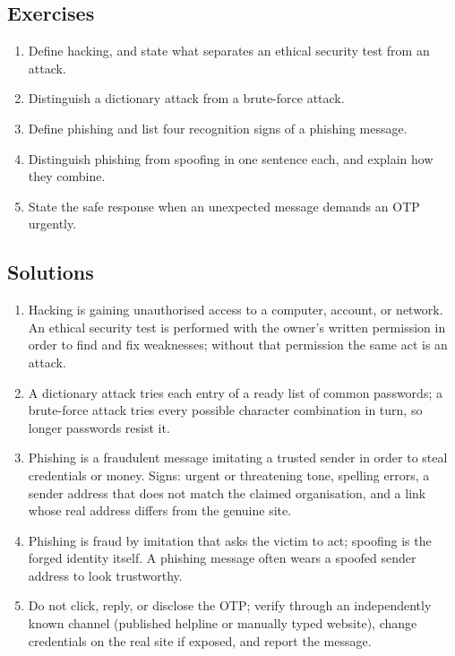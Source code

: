 \subsection*{Exercises}
\begin{enumerate}[label=\arabic*.]
  \item Define hacking, and state what separates an ethical security
    test from an attack.
  \item Distinguish a dictionary attack from a brute-force attack.
  \item Define phishing and list four recognition signs of a phishing
    message.
  \item Distinguish phishing from spoofing in one sentence each, and
    explain how they combine.
  \item State the safe response when an unexpected message demands an
    OTP urgently.
\end{enumerate}

\subsection*{Solutions}
\begingroup\small
\begin{enumerate}[label=\arabic*.]
  \item Hacking is gaining unauthorised access to a computer, account,
    or network. An ethical security test is performed with the owner's
    written permission in order to find and fix weaknesses; without
    that permission the same act is an attack.
  \item A dictionary attack tries each entry of a ready list of common
    passwords; a brute-force attack tries every possible character
    combination in turn, so longer passwords resist it.
  \item Phishing is a fraudulent message imitating a trusted sender in
    order to steal credentials or money. Signs: urgent or threatening
    tone, spelling errors, a sender address that does not match the
    claimed organisation, and a link whose real address differs from
    the genuine site.
  \item Phishing is fraud by imitation that asks the victim to act;
    spoofing is the forged identity itself. A phishing message often
    wears a spoofed sender address to look trustworthy.
  \item Do not click, reply, or disclose the OTP; verify through an
    independently known channel (published helpline or manually typed
    website), change credentials on the real site if exposed, and
    report the message.
\end{enumerate}
\endgroup

